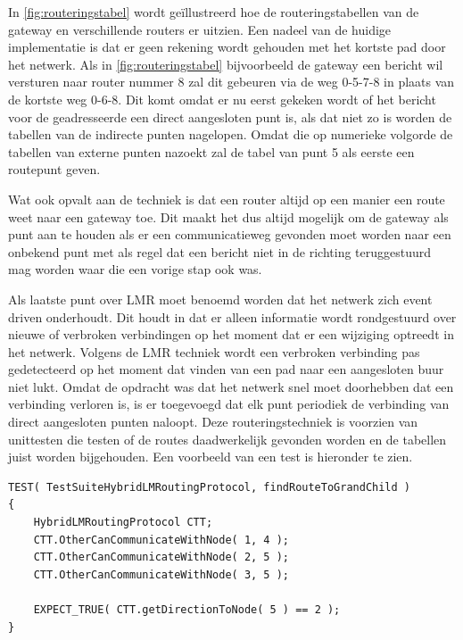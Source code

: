 \documentclass[a4paper, 11pt, oneside]{report}
\begin{document}
In \autoref{fig:routeringstabel} wordt geïllustreerd hoe de routeringstabellen van de gateway en verschillende routers er uitzien.
Een nadeel van de huidige implementatie is dat er geen rekening wordt gehouden met het kortste pad door het netwerk.
Als in \autoref{fig:routeringstabel} bijvoorbeeld de gateway een bericht wil versturen naar router nummer 8 zal dit gebeuren via de weg 0-5-7-8 in plaats van de kortste weg 0-6-8. Dit komt omdat er nu eerst gekeken wordt of het bericht voor de geadresseerde een direct aangesloten punt is, als dat niet zo is worden de tabellen van de indirecte punten nagelopen. Omdat die op numerieke volgorde de tabellen van externe punten nazoekt zal de tabel van punt 5 als eerste een routepunt geven.

Wat ook opvalt aan de techniek is dat een router altijd op een manier een route weet naar een gateway toe. Dit maakt het dus altijd mogelijk om de gateway als punt aan te houden als er een communicatieweg gevonden moet worden naar een onbekend punt met als regel dat een bericht niet in de richting teruggestuurd mag worden waar die een vorige stap ook was.

Als laatste punt over LMR moet benoemd worden dat het netwerk zich event driven onderhoudt.
Dit houdt in dat er alleen informatie wordt rondgestuurd over nieuwe of verbroken verbindingen op het moment dat er een wijziging optreedt in het netwerk. 
Volgens de LMR techniek wordt een verbroken verbinding pas gedetecteerd op het moment dat vinden van een pad naar een aangesloten buur niet lukt.
Omdat de opdracht was dat het netwerk snel moet doorhebben dat een verbinding verloren is, is er toegevoegd dat elk punt periodiek de verbinding van direct aangesloten punten naloopt. 
Deze routeringstechniek is voorzien van unittesten die testen of de routes daadwerkelijk gevonden worden en de tabellen juist worden bijgehouden.
Een voorbeeld van een test is hieronder te zien.
\begin{lstlisting}
TEST( TestSuiteHybridLMRoutingProtocol, findRouteToGrandChild )
{
	HybridLMRoutingProtocol CTT;
	CTT.OtherCanCommunicateWithNode( 1, 4 );
	CTT.OtherCanCommunicateWithNode( 2, 5 );
	CTT.OtherCanCommunicateWithNode( 3, 5 );

	EXPECT_TRUE( CTT.getDirectionToNode( 5 ) == 2 );
}
\end{lstlisting}
\end{document}
